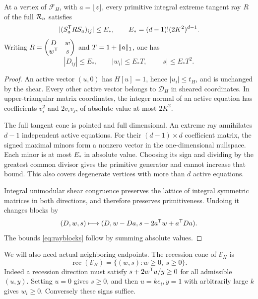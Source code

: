 \begin{lemma}\label{lem:shearedrays}
At a vertex of $\mathcal F_H$, with $a=\lfloor z\rfloor$, every primitive integral extreme tangent ray $R$ of the full $\mathcal R_n$ satisfies
\begin{equation}\label{eq:shearedrays}
 |(S_a^{\mathsf T} RS_a)_{ij}|\le E_*,
 \qquad E_*=(d-1)!(2K^2)^{d-1}.
\end{equation}
Writing $R=\begin{pmatrix}D&w\\w^{\mathsf T}&s\end{pmatrix}$ and $T=1+\lVert a\rVert_1$, one has
\begin{equation}\label{eq:rayblocks}
 |D_{ij}|\le E_*,\qquad |w_i|\le E_*T,\qquad |s|\le E_*T^2.
\end{equation}
\end{lemma}
\begin{proof}
An active vector $(u,0)$ has $H[u]=1$, hence $|u_i|\le t_H$, and is unchanged by the shear. Every other active vector belongs to $\mathcal D_H$ in sheared coordinates. In upper-triangular matrix coordinates, the integer normal of an active equation has coefficients $v_i^2$ and $2v_iv_j$, of absolute value at most $2K^2$.

The full tangent cone is pointed and full dimensional. An extreme ray annihilates $d-1$ independent active equations. For their $(d-1)\times d$ coefficient matrix, the signed maximal minors form a nonzero vector in the one-dimensional nullspace. Each minor is at most $E_*$ in absolute value. Choosing its sign and dividing by the greatest common divisor gives the primitive generator and cannot increase that bound. This also covers degenerate vertices with more than $d$ active equations.

Integral unimodular shear congruence preserves the lattice of integral symmetric matrices in both directions, and therefore preserves primitiveness. Undoing it changes blocks by
\[
 (D,w,s)\longmapsto(D,w-Da,s-2a^{\mathsf T} w+a^{\mathsf T} Da).
\]
The bounds \eqref{eq:rayblocks} follow by summing absolute values.
\end{proof}

We will also need actual neighboring endpoints. The recession cone of $\mathcal E_H$ is
\begin{equation}\label{eq:recession}
 \operatorname{rec}(\mathcal E_H)=\{(w,s):w\ge0,\ s\ge0\}.
\end{equation}
Indeed a recession direction must satisfy $s+2w^{\mathsf T} u/y\ge0$ for all admissible $(u,y)$. Setting $u=0$ gives $s\ge0$, and then $u=ke_i,y=1$ with arbitrarily large $k$ gives $w_i\ge0$. Conversely these signs suffice.

